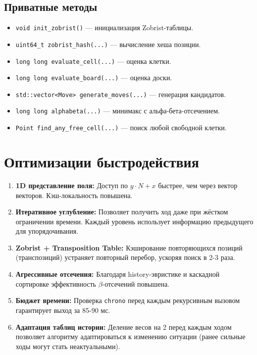 \documentclass[a4paper,14pt]{extreport}
\begin{document}
\subsection{Приватные методы}
\begin{itemize}
    \item \texttt{void init\_zobrist()} — инициализация Zobrist-таблицы.
    \item \texttt{uint64\_t zobrist\_hash(...)} — вычисление хеша позиции.
    \item \texttt{long long evaluate\_cell(...)} — оценка клетки.
    \item \texttt{long long evaluate\_board(...)} — оценка доски.
    \item \texttt{std::vector<Move> generate\_moves(...)} — генерация кандидатов.
    \item \texttt{long long alphabeta(...)} — минимакс с альфа-бета-отсечением.
    \item \texttt{Point find\_any\_free\_cell(...)} — поиск любой свободной клетки.
\end{itemize}

\section{Оптимизации быстродействия}
\begin{enumerate}
    \item \textbf{1D представление поля:} Доступ по $y \cdot N + x$ быстрее, чем через вектор векторов. Кэш-локальность повышена.
    \item \textbf{Итеративное углубление:} Позволяет получить ход даже при жёстком ограничении времени. Каждый уровень использует информацию предыдущего для упорядочивания.
    \item \textbf{Zobrist + Transposition Table:} Кэширование повторяющихся позиций (транспозиций) устраняет повторный перебор, ускоряя поиск в 2-3 раза.
    \item \textbf{Агрессивные отсечения:} Благодаря history-эвристике и каскадной сортировке эффективность $\beta$-отсечений повышена.
    \item \textbf{Бюджет времени:} Проверка \texttt{chrono} перед каждым рекурсивным вызовом гарантирует выход за 85-90 мс.
    \item \textbf{Адаптация таблиц истории:} Деление весов на 2 перед каждым ходом позволяет алгоритму адаптироваться к изменению ситуации (ранее сильные ходы могут стать неактуальными).
\end{enumerate}
\end{document}
